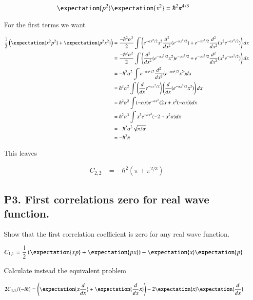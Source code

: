 \documentclass{article}
\begin{document}
\begin{align*}
\expectation{p^2} \expectation{x^2} &= \hbar^2 \pi^{4/3}
\end{align*}

For the first terms we want

\begin{align*}
\inv{2} \left( \expectation{x^2 p^2} + \expectation{p^2 x^2} \right)
&=
\frac{-\hbar^2 \alpha^2}{2} \int \left( 
e^{-\alpha x^2/2} x^2 \frac{d^2}{dx^2} (e^{-\alpha x^2/2} )
+ e^{-\alpha x^2/2} \frac{d^2}{dx^2} ( x^2 e^{-\alpha x^2/2} ) \right) dx \\
&=
\frac{-\hbar^2 \alpha^2}{2} \int \left( 
 \frac{d^2}{dx^2} ( e^{-\alpha x^2/2} x^2 ) e^{-\alpha x^2/2} 
+ e^{-\alpha x^2/2} \frac{d^2}{dx^2} ( x^2 e^{-\alpha x^2/2} ) \right) dx \\
&=
{-\hbar^2 \alpha^2} \int e^{-\alpha x^2/2} \frac{d^2}{dx^2} ( e^{-\alpha x^2/2} x^2 ) dx \\
&=
{\hbar^2 \alpha^2} \int \left( \frac{d}{dx} e^{-\alpha x^2/2} \right) \left( \frac{d}{dx} ( e^{-\alpha x^2/2} x^2 ) \right) dx \\
&=
{\hbar^2 \alpha^2} \int (-\alpha x) e^{-\alpha x^2} (2x + x^2(-\alpha x)) dx \\
&=
{\hbar^2 \alpha^3} \int x^2 e^{-\alpha x^2} (-2 + x^2 \alpha ) dx \\
&=
{-\hbar^2 \alpha^2} \sqrt{\pi/\alpha}  \\
&=
-\hbar^2 \pi
\end{align*}

This leaves 

\begin{align*}
C_{2,2} &=
-\hbar^2 \left( \pi + \pi^{2/3} \right)
\end{align*}

\subsection{P3. First correlations zero for real wave function. }

Show that the first correlation coefficient is zero for any real wave function.

\begin{align*}
C_{1,1} &= \inv{2}\left( \expectation{x p} + \expectation{p x} \right) - \expectation{x}\expectation{p}
\end{align*}

Calculate instead the equivalent problem

\begin{align*}
2 C_{1,1}/(-i\hbar) &= \left( \expectation{x \frac{d}{dx}} + \expectation{\frac{d}{dx} x} \right) - 2 \expectation{x}\expectation{\frac{d}{dx}}
\end{align*}
\end{document}
